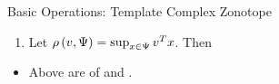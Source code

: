 \begin{frame}{Basic Operations: Template Complex Zonotope}
%
\begin{enumerate}
\item {\small Let $\rho\left(v,\Psi\right)=\sup_{x\in\Psi}v^Tx$}. Then \\
\eqnemph{
\[
\supp{v}{\real\lt(\tcztope{\ptemp}{\cen}{\sfact}\rt)}=v^Tc+\absolute{v^T\ptemp}\sfact.
\]
}
\end{enumerate}
%
\begin{itemize}
\item Above are  of 
and .
\end{itemize}
%
\end{frame}


